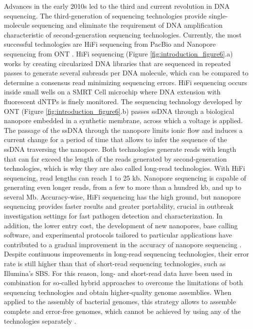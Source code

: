 Advances in the early 2010s led to the third and current revolution in \ac{DNA} sequencing.
The third-generation of sequencing technologies provide single-molecule sequencing and eliminate the requirement of \ac{DNA} amplification characteristic of second-generation sequencing technologies. Currently, the most successful technologies are HiFi sequencing from \ac{PacBio} \cite{wenger_accurate_2019, eid_real-time_2009} and Nanopore sequencing from \ac{ONT} \cite{mikheyev_first_2014, stoddart_single-nucleotide_2009}. HiFi sequencing (Figure \ref{fig:introduction_figure6}.a) works by creating circularized \ac{DNA} libraries that are sequenced in repeated passes to generate several subreads per \ac{DNA} molecule, which can be compared to determine a consensus read minimizing sequencing errors. HiFi sequencing occurs inside small wells on a \ac{SMRT} Cell microchip where \ac{DNA} extension with fluorescent \ac{dNTPs} is finely monitored. The sequencing technology developed by \ac{ONT} (Figure \ref{fig:introduction_figure6}.b) passes \ac{ssDNA} through a biological nanopore embedded in a synthetic membrane, across which a voltage is applied. The passage of the \ac{ssDNA} through the nanopore limits ionic flow and induces a current change for a period of time that allows to infer the sequence of the \ac{ssDNA} traversing the nanopore. Both technologies generate reads with length that can far exceed the length of the reads generated by second-generation technologies, which is why they are also called long-read technologies. With HiFi sequencing, read lengths can reach 1 to 25 \ac{kb}. Nanopore sequencing is capable of generating even longer reads, from a few to more than a hundred \ac{kb}, and up to several \ac{Mb}. Accuracy-wise, HiFi sequencing has the high ground, but nanopore sequencing provides faster results and greater portability, crucial in outbreak investigation settings for fast pathogen detection and characterization. In addition, the lower entry cost, the development of new nanopores, base calling software, and experimental protocols tailored to particular applications have contributed to a gradual improvement in the accuracy of nanopore sequencing \cite{wang_nanopore_2021, wick_autocycler_2025, foster-nyarko_nanopore-only_2023, wick_trycycler_2021}. Despite continuous improvements in long-read sequencing technologies, their error rate is still higher than that of short-read sequencing technologies, such as Illumina's \ac{SBS}. For this reason, long- and short-read data have been used in combination for so-called hybrid approaches to overcome the limitations of both sequencing technologies and obtain higher-quality genome assemblies. When applied to the assembly of bacterial genomes, this strategy allows to assemble complete and error-free genomes, which cannot be achieved by using any of the technologies separately \cite{wick_assembling_2023, bouras_hybracter_2024, stevens_comparison_2023, wick_assembling_2023, bouras_hybracter_2024}.

